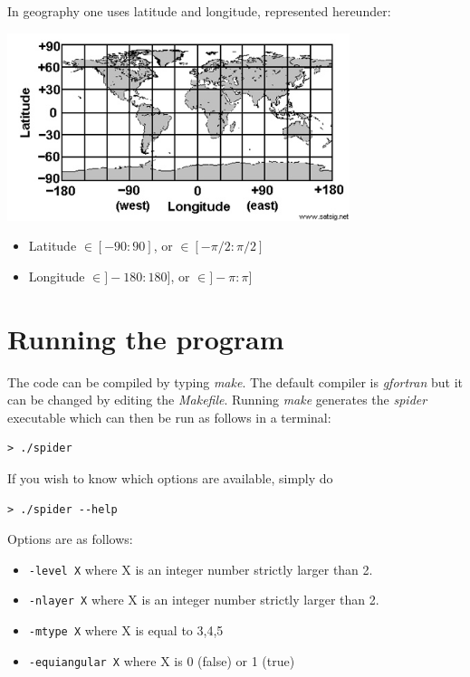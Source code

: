 \documentclass[a4paper]{article}
\begin{document}
In geography one uses latitude and longitude, represented hereunder:
\begin{center}
\includegraphics[width=10cm]{images/map.jpg}
\end{center}
\begin{itemize}
\item Latitude  $\in[-90:90]$,   or $\in[-\pi/2:\pi/2]$ 
\item Longitude $\in]-180:180]$, or $\in]-\pi:\pi]$ 
\end{itemize}


\section{Running the program}

The code can be compiled by typing {\sl make}. The default compiler is {\sl gfortran}
but it can be changed by editing the {\sl Makefile}. 
Running {\sl make} generates the {\sl spider} executable which can then be run as follows
in a terminal:

\begin{verbatim}
> ./spider
\end{verbatim}

If you wish to know which options are available, simply do 
\begin{verbatim}
> ./spider --help
\end{verbatim}

Options are as follows:
\begin{itemize}
\item {\tt -level X} where X is an integer number strictly larger than 2.
\item {\tt -nlayer X} where X is an integer number strictly larger than 2.
\item {\tt -mtype X} where X is equal to 3,4,5 
\item {\tt -equiangular X} where X is 0 (false) or 1 (true) 
\end{itemize}
\end{document}
